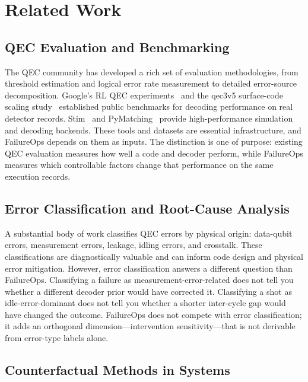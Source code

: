\section{Related Work}

\subsection{QEC Evaluation and Benchmarking}

The QEC community has developed a rich set of evaluation methodologies, from threshold estimation and logical error rate measurement to detailed error-source decomposition. Google's RL QEC experiments~\cite{google2023} and the qec3v5 surface-code scaling study~\cite{google2022} established public benchmarks for decoding performance on real detector records. Stim~\cite{stim} and PyMatching~\cite{pymatching} provide high-performance simulation and decoding backends. These tools and datasets are essential infrastructure, and FailureOps depends on them as inputs. The distinction is one of purpose: existing QEC evaluation measures how well a code and decoder perform, while FailureOps measures which controllable factors change that performance on the same execution records.

\subsection{Error Classification and Root-Cause Analysis}

A substantial body of work classifies QEC errors by physical origin: data-qubit errors, measurement errors, leakage, idling errors, and crosstalk. These classifications are diagnostically valuable and can inform code design and physical error mitigation. However, error classification answers a different question than FailureOps. Classifying a failure as measurement-error-related does not tell you whether a different decoder prior would have corrected it. Classifying a shot as idle-error-dominant does not tell you whether a shorter inter-cycle gap would have changed the outcome. FailureOps does not compete with error classification; it adds an orthogonal dimension---intervention sensitivity---that is not derivable from error-type labels alone.

\subsection{Counterfactual Methods in Systems}

